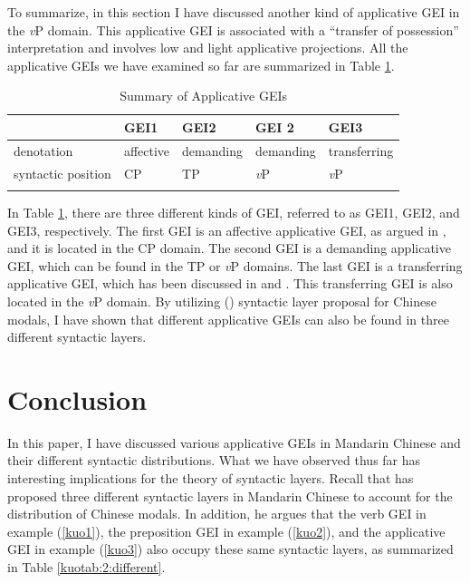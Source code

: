 \documentclass[output=paper,colorlinks,citecolor=brown]{langscibook}
\begin{document}
To summarize, in this section I have discussed another kind of applicative GEI in the \textit{v}P domain. This applicative GEI is associated with a ``transfer of possession'' interpretation and involves low and light applicative projections. All the applicative GEIs we have examined so far are summarized in Table \ref{kuotab:1:three}.

\begin{table}
\caption{Summary of Applicative GEIs}
\label{kuotab:1:three}
 \begin{tabular}{lllll} 
  \lsptoprule
            & GEI1 & GEI2 & GEI 2 & GEI3\\ 
  \midrule
  denotation  &  affective &  demanding &  demanding  & transferring\\
  syntactic position  & CP & TP & \textit{v}P & \textit{v}P\\
  \lspbottomrule
 \end{tabular}
\end{table}

In Table \ref{kuotab:1:three}, there are three different kinds of GEI, referred to as GEI1, GEI2, and GEI3, respectively. The first GEI is an affective applicative GEI, as argued in \citet{Tsai2017}, and it is located in the CP domain. The second GEI is a demanding applicative GEI, which can be found in the TP or \textit{v}P domains. The last GEI is a transferring applicative GEI, which has been discussed in \citet{Paul&Whitman2010} and \citet{Kuo2016}. This transferring GEI is also located in the \textit{v}P domain. By utilizing  (\citeyear{Tsai2015b}) syntactic layer proposal for Chinese modals, I have shown that different applicative GEIs can also be found in three different syntactic layers.

\section{Conclusion}\label{sect6}

In this paper, I have discussed various applicative GEIs in Mandarin Chinese and their different syntactic distributions. What we have observed thus far has interesting implications for the theory of syntactic layers. Recall that \citet{Tsai2017} has proposed three different syntactic layers in Mandarin Chinese to account for the distribution of Chinese modals. In addition, he argues that the verb GEI in example (\ref{kuo1}), the preposition GEI in example (\ref{kuo2}), and the applicative GEI in example (\ref{kuo3}) also occupy these same syntactic layers, as summarized in Table \ref{kuotab:2:different}.
\end{document}
